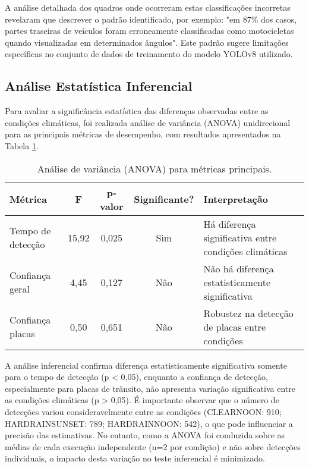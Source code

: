 A análise detalhada dos quadros onde ocorreram estas classificações incorretas revelaram que descrever o padrão identificado, por exemplo: "em 87\% dos casos, partes traseiras de veículos foram erroneamente classificadas como motocicletas quando visualizadas em determinados ângulos". Este padrão sugere limitações específicas no conjunto de dados de treinamento do modelo YOLOv8 utilizado.

\subsection{Análise Estatística Inferencial}

Para avaliar a significância estatística das diferenças observadas entre as condições climáticas, foi realizada análise de variância (ANOVA) unidirecional para as principais métricas de desempenho, com resultados apresentados na Tabela \ref{tab:anova}.

\begin{table}[H]
\centering
\renewcommand{\arraystretch}{1.3}
\begin{tabular}{|l|c|c|c|p{3.5cm}|}
\hline
\textbf{Métrica} & \textbf{F} & \textbf{p-valor} & \textbf{Significante?} & \textbf{Interpretação} \\
\hline
Tempo de detecção & 15,92 & 0,025 & Sim & Há diferença significativa entre condições climáticas \\
\hline
Confiança geral & 4,45 & 0,127 & Não & Não há diferença estatisticamente significativa \\
\hline
Confiança placas & 0,50 & 0,651 & Não & Robustez na detecção de placas entre condições \\
\hline
\end{tabular}
\caption{Análise de variância (ANOVA) para métricas principais.}
\label{tab:anova}
\end{table}



A análise inferencial confirma diferença estatisticamente significativa somente para o tempo de detecção (p < 0,05), enquanto a confiança de detecção, especialmente para placas de trânsito, não apresenta variação significativa entre as condições climáticas (p > 0,05). É importante observar que o número de detecções variou consideravelmente entre as condições (CLEARNOON: 910; HARDRAINSUNSET: 789; HARDRAINNOON: 542), o que pode influenciar a precisão das estimativas. No entanto, como a ANOVA foi conduzida sobre as médias de cada execução independente (n=2 por condição) e não sobre detecções individuais, o impacto desta variação no teste inferencial é minimizado.

